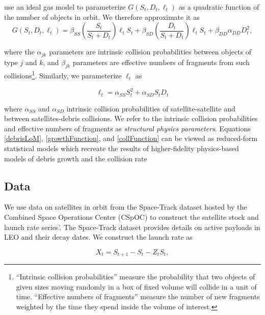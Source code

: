 \documentclass[12pt]{article}
\begin{document}
\cite{bradleywein2009} use an ideal gas model to parameterize $G(S_t,D_t,\ell_t)$ as a quadratic function of the number of objects in orbit. We therefore approximate it as
\begin{equation}
\label{growthFunction}
G(S_t,D_t,\ell_t) = \beta_{SS} \left( \frac{S_t}{S_t+D_t} \right ) \ell_t S_t + \beta_{SD}\left( \frac{D_t}{S_t+D_t} \right ) \ell_t S_t +  \beta_{DD} \alpha_{DD} D_t^2,
\end{equation}

where the $\alpha_{jk}$ parameters are intrinsic collision probabilities between objects of type $j$ and $k$, and $\beta_{jk}$ parameters are effective numbers of fragments from such collisions\footnote{``Intrinsic collision probabilities'' measure the probability that two objects of given sizes moving randomly in a box of fixed volume will collide in a unit of time. ``Effective numbers of fragments'' measure the number of new fragments weighted by the time they spend inside the volume of interest.}. Similarly, we parameterize $\ell_t$ as

\begin{equation}
\label{collFunction}
\ell_t = \alpha_{SS} S_t^2 + \alpha_{SD} S_t D_t
\end{equation}

where $\alpha_{SS}$ and $\alpha_{SD}$ intrinsic collision probabilities of satellite-satellite and between satellites-debris collisions. We refer to the intrinsic collision probabilities and effective numbers of fragments as \textit{structural physics parameters}. Equations \ref{debrisLoM}, \ref{growthFunction}, and \ref{collFunction} can be viewed as reduced-form statistical models which recreate the results of higher-fidelity physics-based models of debris growth and the collision rate

\subsection*{Data}

We use data on satellites in orbit from the Space-Track dataset hosted by the Combined Space Operations Center (CSpOC) \citep{spacetrackData} to construct the satellite stock and launch rate series'. The Space-Track dataset provides details on active payloads in LEO and their decay dates. We construct the launch rate as

\begin{equation}
X_t = S_{t+1} - S_t - Z_tS_t,
\end{equation}
\end{document}
